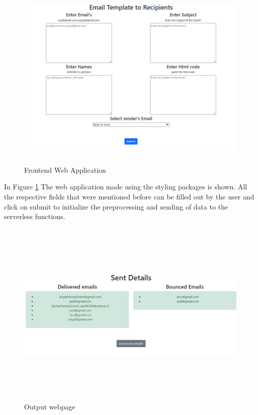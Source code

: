 \begin{figure}[H]
            \centering
            \includegraphics[width=150mm,height=90mm]{figures/frontend_1.png}
            \caption{Frontend Web Application}
            \label{fig:frontend-web}
\end{figure}

In Figure \ref{fig:frontend-web} The web application made using the styling packages is shown. All the respective fields that were mentioned before can be filled out by the user and click on submit to initialize the preprocessing and sending of data to the serverless functions.


\begin{figure}[H]
            \centering
            \includegraphics[width=130mm,height=90mm]{figures/result_1.png}
            \caption{Output webpage}
            \label{fig:frontend-output}
\end{figure}


